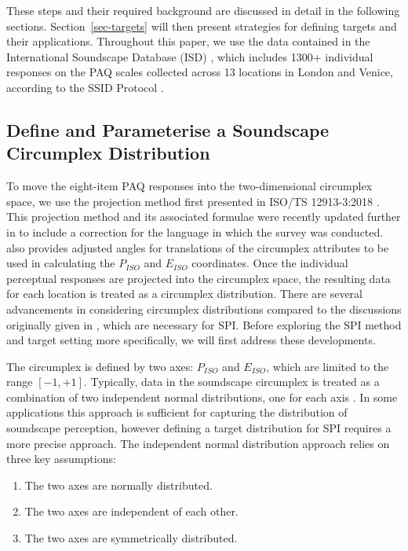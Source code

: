 \documentclass[
  authoryear,
  preprint,
  3p]{elsarticle}
\providecommand{\tightlist}{%
  \setlength{\itemsep}{0pt}\setlength{\parskip}{0pt}}\usepackage{longtable,booktabs,array}
\begin{document}
These steps and their required background are discussed in detail in the
following sections. Section~\ref{sec-targets} will then present
strategies for defining targets and their applications. Throughout this
paper, we use the data contained in the International Soundscape
Database (ISD) \citep{Mitchell2024International}, which includes 1300+
individual responses on the PAQ scales collected across 13 locations in
London and Venice, according to the SSID Protocol
\citet{Mitchell2020Soundscape}.

\subsection{Define and Parameterise a Soundscape Circumplex
Distribution}\label{sec-circumplex-distribution}

To move the eight-item PAQ responses into the two-dimensional circumplex
space, we use the projection method first presented in ISO/TS
12913-3:2018 \citep{ISO12913Part3}. This projection method and its
associated formulae were recently updated further in
\citet{Mitchell2023Testing} to include a correction for the language in
which the survey was conducted. \citet{Mitchell2023Testing} also
provides adjusted angles for translations of the circumplex attributes
to be used in calculating the \(P_{ISO}\) and \(E_{ISO}\) coordinates.
Once the individual perceptual responses are projected into the
circumplex space, the resulting data for each location is treated as a
circumplex distribution. There are several advancements in considering
circumplex distributions compared to the discussions originally given in
\citet{Mitchell2022How}, which are necessary for SPI. Before exploring
the SPI method and target setting more specifically, we will first
address these developments.

The circumplex is defined by two axes: \(P_{ISO}\) and \(E_{ISO}\),
which are limited to the range \([-1, +1]\). Typically, data in the
soundscape circumplex is treated as a combination of two independent
normal distributions, one for each axis
\citep{Mitchell2022How, Ooi2022Probably}. In some applications this
approach is sufficient for capturing the distribution of soundscape
perception, however defining a target distribution for SPI requires a
more precise approach. The independent normal distribution approach
relies on three key assumptions:

\begin{enumerate}
\def\labelenumi{\arabic{enumi}.}
\tightlist
\item
  The two axes are normally distributed.
\item
  The two axes are independent of each other.
\item
  The two axes are symmetrically distributed.
\end{enumerate}
\end{document}
